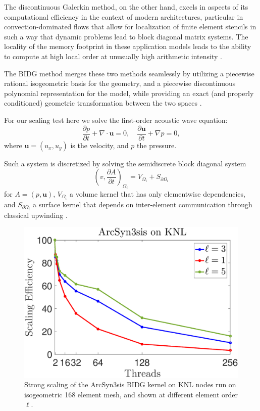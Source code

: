 The discontinuous Galerkin method, on the other hand, excels in aspects of its computational efficiency in the context of modern architectures, particular in convection-dominated flows that allow for localization of finite element stencils in such a way that dynamic problems lead to block diagonal matrix systems.  The locality of the memory footprint in these application models leads to the ability to compute at high local order at unusually high arithmetic intensity \cite{Klockner20097863}.

The BIDG method merges these two methods seamlessly by utilizing a piecewise rational isogeometric basis for the geometry, and a piecewise discontinuous polynomial representation for the model, while providing an exact (and properly conditioned) geometric transformation between the two spaces  \cite{Michoski2016658}.

For our scaling test here we solve the first-order acoustic wave equation: \begin{equation} \label{awe} \frac{\partial p}{\partial t} + \nabla\cdot \boldsymbol{u} = 0, \quad  \frac{\partial\boldsymbol{u}}{\partial t} + \nabla p = 0, \end{equation} where $\boldsymbol{u}=(u_x,u_y)$ is the velocity, and $p$ the pressure.

Such a system is discretized by solving the semidiscrete block diagonal system \[ \left( v, \frac{ \partial A}{\partial t} \right)_{\Omega_{i}}= V_{\Omega_{i}}+S_{\partial\Omega_{i}} \] for $A = (p,\boldsymbol{u})$, $V_{\Omega_{i}}$ a volume kernel that has only elementwise dependencies, and $S_{\partial\Omega_{i}}$ a surface kernel that depends on inter-element communication through classical upwinding \cite{Michoski2014898}.  


\begin{figure}[h]
\begin{center}
\includegraphics[width=0.95\linewidth]{./bidg_data/scaling_p}
\end{center}
\vspace*{-.5cm}
\caption{Strong scaling of the ArcSyn3sis BIDG kernel on KNL nodes run on isogeometric 168 element mesh, and shown at different element order $\ell$.}
\label{fig:bidg_scaling}
\end{figure}


